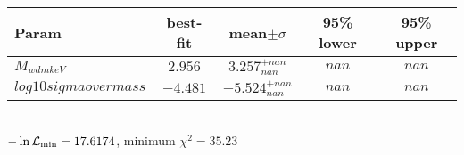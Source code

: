 \begin{tabular}{|l|c|c|c|c|} 
 \hline 
Param & best-fit & mean$\pm\sigma$ & 95\% lower & 95\% upper \\ \hline 
$M_{wdm keV }$ &$2.956$ & $3.257_{nan}^{+nan}$ & $nan$ & $nan$ \\ 
$log10sigmaovermass$ &$-4.481$ & $-5.524_{nan}^{+nan}$ & $nan$ & $nan$ \\ 
\hline 
 \end{tabular} \\ 
$-\ln{\cal L}_\mathrm{min} =17.6174$, minimum $\chi^2=35.23$ \\ 
